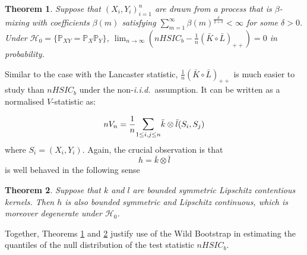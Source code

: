 \documentclass[]{article}
\newtheorem{theorem}{Theorem}
\begin{document}
\begin{theorem}\label{theorem:HSIC-conv-in-prob} Suppose that $(X_i,Y_i)_{i=1}^n$ are drawn from a process that is $\beta$-mixing with coefficients $\beta(m)$ satisfying $\sum_{m=1}^{\infty}\beta(m)^{\frac{\delta}{2+\delta}}<\infty$ for some $\delta>0$. Under $\mathcal{H}_0 = \{ \mathbb{P}_{XY} = \mathbb{P}_X\mathbb{P}_Y\}$, $\lim_{n \to \infty} ( nHSIC_b - \frac{1}{n} (\bar{K}\circ \bar{L})_{++} ) =0 $ in probability.
\end{theorem}
Similar to the case with the Lancaster statistic, $\frac{1}{n} (\bar{K}\circ \bar{L})_{++}$ is much easier to study than $nHSIC_b$ under the non-\emph{i.i.d.}~assumption. It can be written as a normalised $V$-statistic as:
 
\[ 
nV_n = \frac{1}{n} \mathlarger{\sum}_{1\leq i,j \leq n} \bar{k} \otimes \bar{l}(S_i,S_j)
\]
where  $S_i = (X_i,Y_i)$. Again, the crucial observation is that
\[
 h = \bar{k} \otimes \bar{l}
\]
is well behaved in the following sense 
\begin{theorem}\label{theorem:HSIC-degenerate-kernel}
Suppose that $k$ and $l$ are bounded symmetric Lipschitz contentious kernels. Then $h$ is also bounded symmetric and Lipschitz continuous, which is moreover degenerate under $\mathcal{H}_0$.
\end{theorem}

Together, Theorems \ref{theorem:HSIC-conv-in-prob} and \ref{theorem:HSIC-degenerate-kernel} justify use of the Wild Bootstrap in estimating the quantiles of the null distribution of the test statistic $nHSIC_b$.
\end{document}

